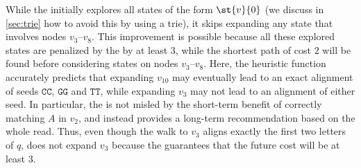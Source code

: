 While the \seedh initially explores all states of the form $\st{v}{0}$ (we
discuss in \cref{sec:trie} how to avoid this by using a trie), it skips
expanding any state that involves nodes $v_{3}$--$v_{8}$. This improvement is
possible because all these explored states are penalized by the \seedh by at
least $3$, while the shortest path of cost $2$ will be found before considering
states on nodes $v_{3}$--$v_{8}$.
%
Here, the heuristic function accurately predicts that expanding $v_{10}$ may
eventually lead to an exact alignment of seeds
\colorbox{light-yellow}{$\mathtt{CC}$}, \colorbox{light-violet}{$\mathtt{GG}$}
and \colorbox{light-green}{$\mathtt{TT}$}, while expanding $v_3$ may not lead to
an alignment of either seed.
%
In particular, the \seedh is not misled by the short-term benefit of correctly
matching $A$ in $v_{2}$, and instead provides a long-term recommendation based
on the whole read. Thus, even though the walk to $v_{3}$ aligns exactly the
first two letters of $q$, \A does not expand $v_{3}$ because the \seedh
guarantees that the future cost will be at least $3$.

